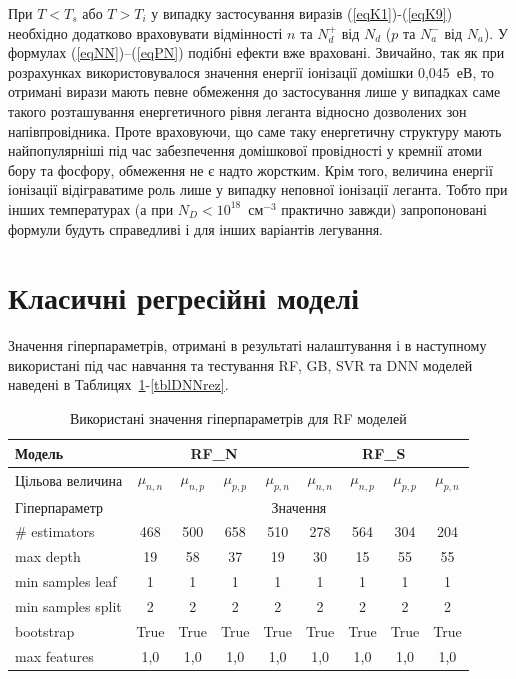 \documentclass[12pt,a4paper,titlepage,oneside]{book}
\numberwithin{equation}{part}
\begin{document}
При $T<T_s$ або $T>T_i$ у випадку застосування виразів (\ref{eqK1})-(\ref{eqK9}) необхідно додатково враховувати
відмінності $n$ та $N_d^+$ від $N_d$ ($p$ та $N_a^-$ від $N_a$).
У формулах (\ref{eqNN})--(\ref{eqPN}) подібні ефекти вже враховані.
Звичайно, так як при розрахунках використовувалося значення енергії іонізації домішки 0,045~еВ, то отримані
вирази мають певне обмеження до застосування лише у випадках саме такого розташування енергетичного рівня леганта відносно дозволених зон
напівпровідника.
Проте враховуючи, що саме таку енергетичну структуру мають найпопулярніші під час забезпечення домішкової провідності у кремнії атоми бору та фосфору,
обмеження не є надто жорстким.
Крім того, величина енергії іонізації відіграватиме роль лише у випадку неповної іонізації леганта.
Тобто при інших температурах (а при $N_D<10^{18}$~см$^{-3}$ практично завжди) запропоновані формули будуть справедливі і для інших варіантів легування.


\section{Класичні регресійні моделі}

Значення гіперпараметрів, отримані в результаті налаштування і в наступному використані під час навчання та тестування RF, GB, SVR та DNN моделей
наведені в Таблицях~\ref{tblRFrez}-\ref{tblDNNrez}.

\begin{table}
\setlength{\tabcolsep}{3pt}
\caption{Використані значення гіперпараметрів для RF моделей}
\label{tblRFrez}
\centering
\begin{tabular}{|l|c|c|c|c|c|c|c|c|}
\hline
Модель& \multicolumn{4}{c|}{RF\_N}& \multicolumn{4}{c|}{RF\_S} \rule{0pt}{11pt}\\
\hline
Цільова величина&$\mu_{n,n}$&$\mu_{n,p}$&$\mu_{p,p}$&$\mu_{p,n}$&$\mu_{n,n}$&$\mu_{n,p}$&$\mu_{p,p}$&$\mu_{p,n}$\\
\hline
Гіперпараметр&\multicolumn{8}{c|}{Значення}\\
\hline
\# estimators&468&500&658&510&278&564&304&204\\
\hline
max depth&19&58&37&19&30&15&55&55\\
\hline
min samples leaf &1&1&1&1&1&1&1&1\\
\hline
min samples split	&2&2&2&2&2&2&2&2\\
\hline
bootstrap	&True&True&True&True&True&True&True&True\\
\hline
max features &1,0&1,0&1,0&1,0&1,0&1,0&1,0&1,0\\
\hline
\end{tabular}
\end{table}
\end{document}
